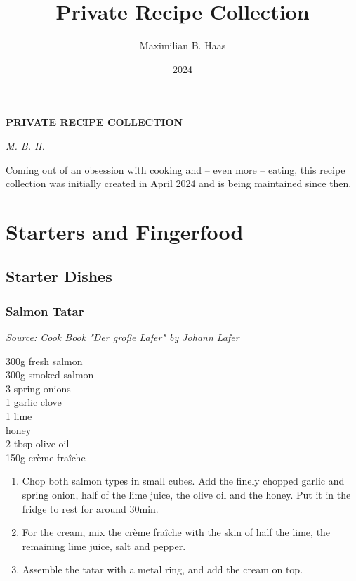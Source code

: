 \documentclass{report}
\title{Private Recipe Collection}
\date{2024}
\author{Maximilian B. Haas}
\begin{document}
\begin{titlepage}
	\centering
	\vspace*{5cm}
	{\huge\bfseries PRIVATE RECIPE COLLECTION\par}
	\vspace{1cm}
	{\Large\itshape M. B. H.\par}
	\vfill
	{\Large Coming out of an obsession with cooking and -- even more -- eating, this recipe collection was initially created in April 2024 and is being maintained since then.}
	\vspace*{1cm}
\end{titlepage}

\tableofcontents
\pagebreak

\part{Starters and Fingerfood}

\chapter{Starter Dishes}
\section{Salmon Tatar}
\textit{Source: Cook Book "Der große Lafer" by Johann Lafer}\\
\begin{minipage}[t]{0.21\textwidth} \vspace{0pt}
300g fresh salmon\\
300g smoked salmon\\
3 spring onions\\
1 garlic clove\\
1 lime\\
honey\\
2 tbsp olive oil\\
150g crème fraîche
\end{minipage}
\hfill
\begin{minipage}[t]{0.78\textwidth} \vspace{0pt}
	\begin{enumerate}
		\item Chop both salmon types in small cubes. Add the finely chopped garlic and spring onion, half of the lime juice, the olive oil and the honey. Put it in the fridge to rest for around 30min.
		\item For the cream, mix the crème fraîche with the skin of half the lime, the remaining lime juice, salt and pepper.
		\item Assemble the tatar with a metal ring, and add the cream on top.
	\end{enumerate}	
\end{minipage}
\end{document}
